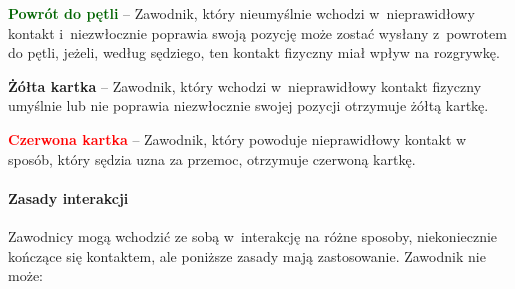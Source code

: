 \documentclass[12pt]{article}
\newcommand\redcard[1]{\bgroup\textcolor{red}{\textbf{#1}}}
\newcommand\yellowcard[1]{\bgroup\textcolor{darkyellow}{\textbf{#1}}}
\newcommand\other[1]{\bgroup\textcolor{darkgreen}{\textbf{#1}}}
\begin{document}
\other{Powrót do pętli} -- Zawodnik, który nieumyślnie wchodzi w~nieprawidłowy kontakt i~niezwłocznie poprawia swoją pozycję może zostać
wysłany z~powrotem do pętli, jeżeli, według sędziego, ten kontakt
fizyczny miał wpływ na rozgrywkę.

\yellowcard{Żółta kartka} -- Zawodnik, który wchodzi w~nieprawidłowy kontakt
fizyczny umyślnie lub nie poprawia niezwłocznie swojej pozycji otrzymuje
żółtą kartkę.

\redcard{Czerwona kartka} -- Zawodnik, który powoduje nieprawidłowy kontakt
w sposób, który sędzia uzna za przemoc, otrzymuje czerwoną kartkę.

\paragraph{Zasady interakcji}
Zawodnicy mogą wchodzić ze sobą w~interakcję na różne sposoby, niekoniecznie kończące się kontaktem, ale
poniższe zasady mają zastosowanie. Zawodnik nie może:
\end{document}
